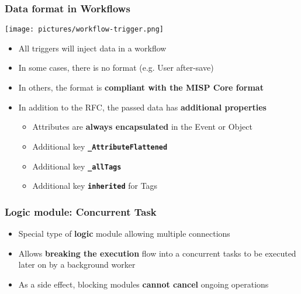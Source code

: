 \begin{frame}
    \frametitle{Data format in Workflows}
    \begin{center}
        \texttt{[image: pictures/workflow-trigger.png]}
    \end{center}
    \begin{itemize}
        \item All triggers will inject data in a workflow
        \item In some cases, there is no format (e.g. User after-save)
        \item In others, the format is \textbf{compliant with the MISP Core format}
        \item In addition to the RFC, the passed data has \textbf{additional properties}
        \begin{itemize}
            \item Attributes are \textbf{always encapsulated} in the Event or Object
            \item Additional key \textbf{\texttt{\_AttributeFlattened}}
            \item Additional key \textbf{\texttt{\_allTags}}
            \item Additional key \textbf{\texttt{inherited}} for Tags
        \end{itemize}
    \end{itemize}
\end{frame}

\begin{frame}
    \frametitle{Logic module: Concurrent Task}
    \begin{itemize}
        \item Special type of \textbf{logic} module allowing multiple connections
        \item Allows \textbf{breaking the execution} flow into a concurrent tasks to be executed later on by a background worker
        \item As a side effect, blocking modules \textbf{cannot cancel} ongoing operations
    \end{itemize}
    \begin{center}
    \end{center}
\end{frame}

